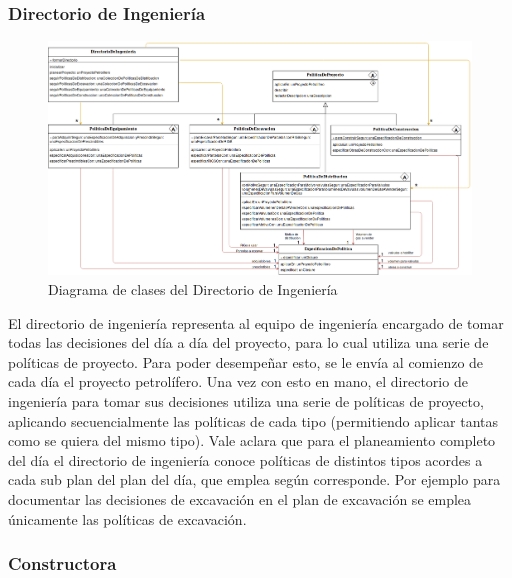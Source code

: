 \documentclass[10pt,a4paper]{article}
\begin{document}
\subsubsection{Directorio de Ingeniería}

\begin{figure}[H]
\centerline{\includegraphics[scale=0.39]{images/DiagramaDeClases_deDirectorioDeIngenieria.png}}
\caption{Diagrama de clases del Directorio de Ingeniería}
\end{figure}

El directorio de ingeniería representa al equipo de ingeniería encargado de tomar todas las decisiones del día a día del proyecto, para lo cual utiliza una serie de políticas de proyecto. Para poder desempeñar esto, se le envía al comienzo de cada día el proyecto petrolífero. Una vez con esto en mano, el directorio de ingeniería para tomar sus decisiones utiliza una serie de políticas de proyecto, aplicando secuencialmente las políticas de cada tipo (permitiendo aplicar tantas como se quiera del mismo tipo). Vale aclara que para el planeamiento completo del día el directorio de ingeniería conoce políticas de distintos tipos acordes a cada sub plan del plan del día, que emplea según corresponde. Por ejemplo para documentar las decisiones de excavación en el plan de excavación se emplea únicamente las políticas de excavación.

\subsubsection{Constructora}
\end{document}
